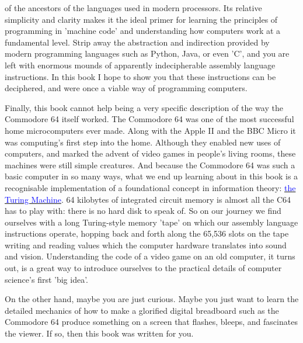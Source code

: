 of the
ancestors of the languages used in modern processors. Its relative 
simplicity and clarity makes it the ideal primer for learning the principles
of programming in 'machine code' and understanding how computers work at a fundamental
level. Strip away the abstraction and indirection provided by modern programming
languages such as Python, Java, or even 'C', and you are left with enormous mounds
of apparently indecipherable assembly language instructions. In this book I hope
to show you that these instructions can be deciphered, and were once a viable
way of programming computers.

Finally, this book cannot help being a very specific description of the way
the Commodore 64 itself worked. The Commodore 64 was one of the most successful
home microcomputers ever made. Along with the Apple II and the BBC Micro it was
computing's first step into the home. Although they enabled new uses of computers,
and marked the advent of video games in people's living rooms, these machines were still
simple creatures. And because the Commodore 64 was such a basic computer
in so many ways, what we end up learning about in this book is a recognisable implementation
of a foundational concept in information theory:
\href{https://en.wikipedia.org/wiki/Turing_machine}{\textcolor{blue}{the Turing Machine}}.
64 kilobytes of integrated circuit memory is almost all the C64 has to play with: there is no hard 
disk to speak of. So on our journey we find ourselves with a long Turing-style memory 'tape' on which
our assembly language instructions operate, hopping back and forth along the 
65,536 slots on the tape writing and reading values which the computer hardware
translates into sound and vision. Understanding the code of a video game on an old computer, it
turns out, is a great way to introduce ourselves to the practical details of
computer science's first 'big idea'.

On the other hand, maybe you are just curious. Maybe you just want to learn the detailed mechanics of how to make a
glorified digital breadboard such as the Commodore 64 produce something on a screen that
flashes, bleeps, and fascinates the viewer. If so, then this book was written for you. 

